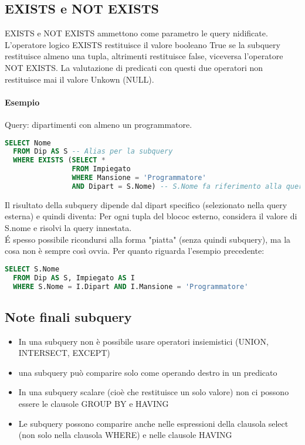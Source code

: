 \subsection{EXISTS e NOT EXISTS}
EXISTS e NOT EXISTS ammettono come parametro le query nidificate. L'operatore logico
EXISTS restituisce il valore booleano True se la subquery restituisce almeno una tupla,
altrimenti restituisce false, viceversa l'operatore NOT EXISTS. La valutazione
di predicati con questi due operatori non restituisce mai il valore Unkown (NULL).
\paragraph*{Esempio} Query: dipartimenti con almeno un programmatore.
\begin{lstlisting}[language=SQL]
  SELECT Nome
  FROM Dip AS S -- Alias per la subquery
  WHERE EXISTS (SELECT *
                FROM Impiegato
                WHERE Mansione = 'Programmatore'
                AND Dipart = S.Nome) -- S.Nome fa riferimento alla query esterna
\end{lstlisting}
Il risultato della subquery dipende dal dipart specifico (selezionato nella query esterna) e quindi
diventa: Per ogni tupla del blococ esterno, considera il valore di S.nome e risolvi la query
innestata.\\
\'E spesso possibile ricondursi alla forma "piatta" (senza quindi subquery), ma la cosa
non è sempre così ovvia. Per quanto riguarda l'esempio precedente:
\begin{lstlisting}[language=SQL]
  SELECT S.Nome
  FROM Dip AS S, Impiegato AS I
  WHERE S.Nome = I.Dipart AND I.Mansione = 'Programmatore'
\end{lstlisting}
\subsection{Note finali subquery}
\begin{itemize}
  \item In una subquery non è possibile usare operatori insiemistici (UNION, INTERSECT, EXCEPT)
  \item una subquery può comparire solo come operando destro in un predicato
  \item In una subquery scalare (cioè che restituisce un solo valore)
   non ci possono essere le clausole GROUP BY e HAVING
  \item Le subquery possono comparire anche nelle espressioni della clausola select (non solo
  nella clausola WHERE) e nelle clausole HAVING
\end{itemize}
